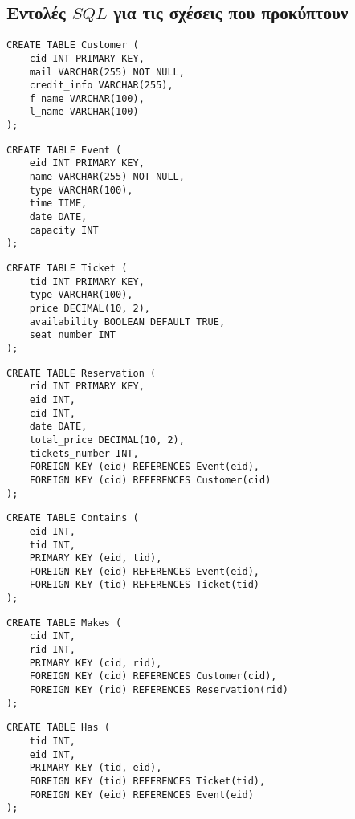 \documentclass{article}
\begin{document}
\subsection*{Εντολές $SQL$ για τις σχέσεις που προκύπτουν}
\begin{lstlisting}
CREATE TABLE Customer (
    cid INT PRIMARY KEY,
    mail VARCHAR(255) NOT NULL,
    credit_info VARCHAR(255),
    f_name VARCHAR(100),
    l_name VARCHAR(100)
);
\end{lstlisting}

\begin{lstlisting}
CREATE TABLE Event (
    eid INT PRIMARY KEY,
    name VARCHAR(255) NOT NULL,
    type VARCHAR(100),
    time TIME,
    date DATE,
    capacity INT
);
\end{lstlisting}

\begin{lstlisting}
CREATE TABLE Ticket (
    tid INT PRIMARY KEY,
    type VARCHAR(100),
    price DECIMAL(10, 2),
    availability BOOLEAN DEFAULT TRUE,
    seat_number INT
);
\end{lstlisting}

\begin{lstlisting}
CREATE TABLE Reservation (
    rid INT PRIMARY KEY,
    eid INT,
    cid INT,
    date DATE,
    total_price DECIMAL(10, 2),
    tickets_number INT,
    FOREIGN KEY (eid) REFERENCES Event(eid),
    FOREIGN KEY (cid) REFERENCES Customer(cid)
);
\end{lstlisting}

\begin{lstlisting}
CREATE TABLE Contains (
    eid INT,
    tid INT,
    PRIMARY KEY (eid, tid),
    FOREIGN KEY (eid) REFERENCES Event(eid),
    FOREIGN KEY (tid) REFERENCES Ticket(tid)
);
\end{lstlisting}

\begin{lstlisting}
CREATE TABLE Makes (
    cid INT,
    rid INT,
    PRIMARY KEY (cid, rid),
    FOREIGN KEY (cid) REFERENCES Customer(cid),
    FOREIGN KEY (rid) REFERENCES Reservation(rid)
);
\end{lstlisting}

\begin{lstlisting}
CREATE TABLE Has (
    tid INT,
    eid INT,
    PRIMARY KEY (tid, eid),
    FOREIGN KEY (tid) REFERENCES Ticket(tid),
    FOREIGN KEY (eid) REFERENCES Event(eid)
);
\end{lstlisting}
\end{document}
